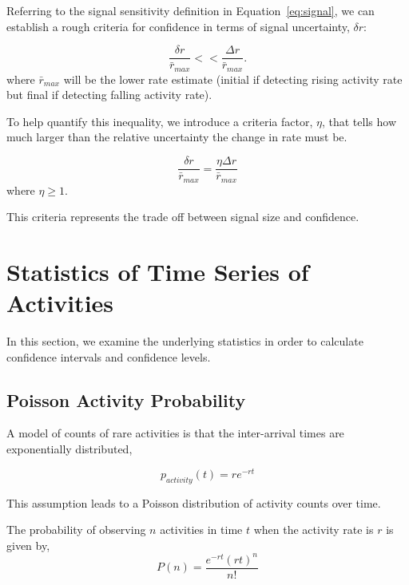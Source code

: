 \documentclass{article}
\begin{document}
Referring to the signal sensitivity definition in Equation~\ref{eq:signal}, we can establish a rough criteria for confidence
in terms of signal uncertainty, $\delta r$:

\begin{equation}
    \label{eq:criteria}
    \frac{\delta r}{\bar{r}_{max}} << \frac{\Delta r}{\bar{r}_{max}}.
\end{equation}
where $\bar{r}_{max}$ will be the lower rate estimate (initial if detecting rising activity rate but final if detecting falling activity rate).

To help quantify this inequality, we introduce a criteria factor, $\eta$, that tells how much larger than the relative
uncertainty the change in rate must be.

\begin{equation}
    \label{eq:criteriaParam}
    \frac{\delta r}{\bar{r}_{max}} = \frac{\eta \Delta r}{\bar{r}_{max}}
\end{equation}
where $\eta \ge 1$.

This criteria represents the trade off between signal size and confidence.

\section{Statistics of Time Series of Activities} 

In this section, we examine the underlying statistics in order to calculate confidence intervals and confidence levels.

\subsection{Poisson Activity Probability} 

A model of counts of rare activities is that the inter-arrival times are exponentially distributed, 

\begin{equation}
    \label{eq:tbe}
    p_{activity}(t) = r e^{-r t}
\end{equation}

This assumption leads to a Poisson distribution of activity counts over time.

The probability of observing $n$ activities in time $t$ when the activity rate is $r$ is given by,
\begin{equation}
    \label{eq:poisson}
    P(n) = \frac{e^{-r t} (r t)^n}{n!}
\end{equation}
\end{document}
